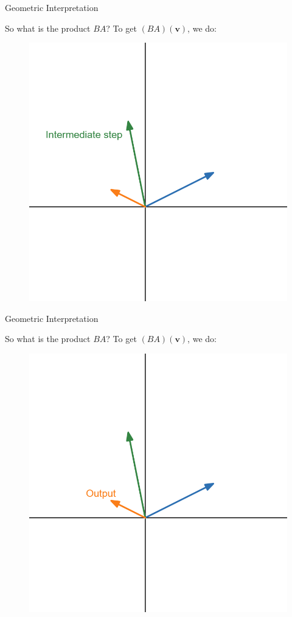 \documentclass{beamer}
\begin{document}
\begin{frame}{Geometric Interpretation }

So what is the product $BA$? To get $(BA)(\mathbf{v})$, we do:

\begin{figure}
    \centering
    \includegraphics[width=0.5\linewidth]{matrix product/desmos-graph (7).png}
\end{figure}    
\end{frame}

\begin{frame}{Geometric Interpretation }

So what is the product $BA$? To get $(BA)(\mathbf{v})$, we do:

\begin{figure}
    \centering
    \includegraphics[width=0.5\linewidth]{matrix product/desmos-graph (8).png}
\end{figure}    
\end{frame}
\end{document}
